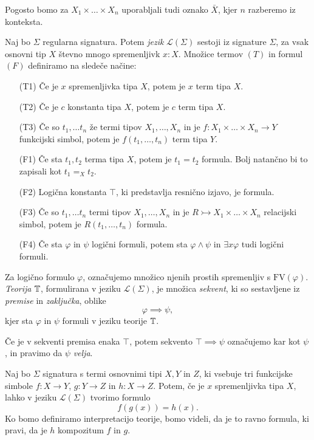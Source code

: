 \documentclass[../kategoricna_logika.tex]{subfiles}
\begin{document}
Pogosto bomo za $X_1 \times \ldots \times X_n$ uporabljali tudi oznako
$\bar{X}$, kjer $n$ razberemo iz konteksta.
\begin{definicija}
  Naj bo $\Sigma$ regularna signatura.  Potem \emph{jezik}
  $\mathcal{L}(\Sigma)$ sestoji iz signature $\Sigma$, za vsak osnovni
  tip $X$ števno mnogo spremenljivk $x:X$.  Množice termov $(T)$ in
  formul $(F)$ definiramo na sledeče načine:
  \begin{itemize}
  \item [(T1)] Če je $x$ spremenljivka tipa $X$, potem je $x$ term
    tipa $X$.
  \item [(T2)] Če je $c$ konstanta tipa $X$, potem je $c$ term tipa
    $X$.
  \item [(T3)] Če so $t_1, \ldots t_n$ že termi tipov
    $X_1, \ldots, X_n$ in je $f : X_1 \times \ldots \times X_n \to Y$
    funkcijski simbol, potem je $f(t_1, \ldots, t_n)$ term tipa $Y$.
  \item [(F1)] Če sta $t_1, t_2$ terma tipa $X$, potem je $t_1 = t_2$
    formula. Bolj natančno bi to zapisali kot $t_1 =_X t_2$.
  \item [(F2)] Logična konstanta $\top$, ki predstavlja resnično
    izjavo, je formula.
  \item [(F3)] Če so $t_1, \ldots t_n$ termi tipov $X_1, \ldots, X_n$
    in je $R \rightarrowtail X_1 \times \ldots \times X_n$ relacijski
    simbol, potem je $R(t_1, \ldots, t_n)$ formula.
  \item [(F4)] Če sta $\varphi$ in $\psi$ logični formuli, potem sta
    $\varphi \wedge \psi$ in $\exists x \varphi$ tudi logični formuli.
  \end{itemize}
  Za logično formulo $\varphi$, označujemo množico njenih prostih
  spremenljiv s $\mathrm{FV}(\varphi)$.  \emph{Teorija} $\mathbb{T}$,
  formulirana v jeziku $\mathcal{L}(\Sigma)$, je množica
  \emph{sekvent}, ki so sestavljene iz \emph{premise} in
  \emph{zaključka}, oblike
  $$\varphi \implies \psi,$$
  kjer sta $\varphi$ in $\psi$ formuli v jeziku teorije $\mathbb{T}$.
\end{definicija}
Če je v sekventi premisa enaka $\top$, potem sekvento
$\top \implies \psi$ označujemo kar kot $\psi$, in pravimo da $\psi$
\emph{velja}.
\begin{primer}\label{primer:kompozitum}
  Naj bo $\Sigma$ signatura s termi osnovnimi tipi $X,Y$ in $Z$, ki
  vsebuje tri funkcijske simbole $f: X \to Y$, $g : Y \to Z$ in
  $h : X \to Z$.  Potem, če je $x$ spremenljivka tipa $X$, lahko v
  jeziku $\mathcal{L}(\Sigma)$ tvorimo formulo
  $$f(g(x)) = h(x).$$
  Ko bomo definiramo interpretacijo teorije, bomo videli, da je to
  ravno formula, ki pravi, da je $h$ kompozitum $f$ in $g$.
\end{primer}
\end{document}
